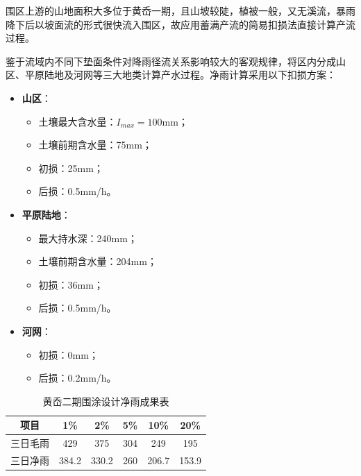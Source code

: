 \documentclass[UTF8, a4paper, 12pt]{ctexart} %
\begin{document}
\par
围区上游的山地面积大多位于黄岙一期，且山坡较陡，植被一般，又无溪流，暴雨降下后以坡面流的形式很快流入围区，故应用蓄满产流的简易扣损法直接计算产流过程。

鉴于流域内不同下垫面条件对降雨径流关系影响较大的客观规律，将区内分成山区、平原陆地及河网等三大地类计算产水过程。净雨计算采用以下扣损方案：

\begin{itemize}
    \item \textbf{山区}：
    \begin{itemize}
        \item 土壤最大含水量：$I_{max}=100$mm；
        \item 土壤前期含水量：75mm；
        \item 初损：25mm；
        \item 后损：0.5mm/h。
    \end{itemize}
    \item \textbf{平原陆地}：
    \begin{itemize}
        \item 最大持水深：240mm；
        \item 土壤前期含水量：204mm；
        \item 初损：36mm；
        \item 后损：0.5mm/h。
    \end{itemize}
    \item \textbf{河网}：
    \begin{itemize}
        \item 初损：0mm；
        \item 后损：0.2mm/h。
    \end{itemize}
\end{itemize}
\begin{table}[h]
    \centering
    \caption{黄岙二期围涂设计净雨成果表}
    \begin{tabular}{|c|c|c|c|c|c|}
        \hline
        项目 & 1\% & 2\% & 5\% & 10\% & 20\% \\ \hline
        三日毛雨 & 429 & 375 & 304 & 249 & 195 \\ \hline
        三日净雨 & 384.2 & 330.2 & 260 & 206.7 & 153.9 \\ \hline
    \end{tabular}
    \label{tab:three_day_rainfall}
\end{table}
\end{document}
